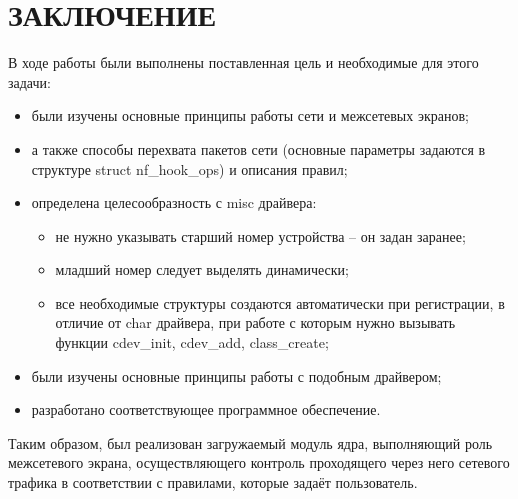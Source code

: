\section*{ЗАКЛЮЧЕНИЕ}

В ходе работы были выполнены поставленная цель и необходимые для этого задачи:
\begin{itemize}
	\item были изучены основные принципы работы сети и межсетевых экранов;

	\item а также способы перехвата пакетов сети (основные параметры задаются в структуре struct nf\_hook\_ops) и описания правил;
	
	\item определена целесообразность с misc драйвера:
	\begin{itemize}
		\item не нужно указывать старший номер устройства -- он задан заранее;
		
		\item младший номер следует выделять динамически;
		
		\item все необходимые структуры создаются автоматически при регистрации, в отличие от char драйвера, при работе с которым нужно вызывать функции cdev\_init, cdev\_add, class\_create;
	\end{itemize}

	\item были изучены основные принципы работы с подобным драйвером;
	
	\item разработано соответствующее программное обеспечение.\newline
\end{itemize}

Таким образом, был реализован загружаемый модуль ядра, выполняющий роль межсетевого экрана, осуществляющего контроль проходящего через него сетевого трафика в соответствии с правилами, которые задаёт пользователь. 

\pagebreak